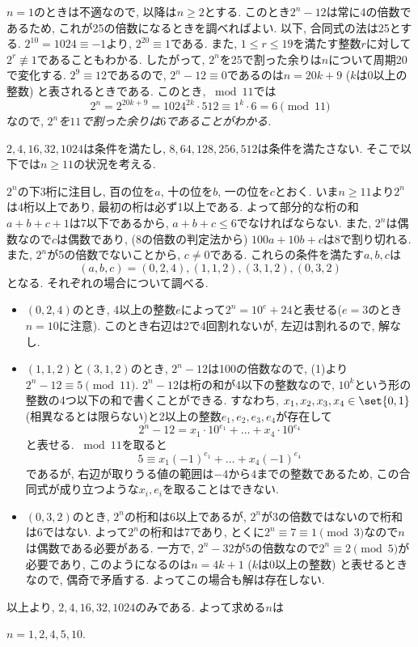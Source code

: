 $n=1$のときは不適なので, 以降は$n\geq 2$とする. このとき$2^n - 12$は常に4の倍数であるため, これが25の倍数になるときを調べればよい. 以下, 合同式の法は25とする. $2^{10} = 1024 \equiv -1$より, $2^{20}\equiv 1$である. また, $1\leq r\leq 19$を満たす整数$r$に対して$2^r\not\equiv 1$であることもわかる. したがって, $2^n$を25で割った余りは$n$について周期20で変化する. $2^9 \equiv 12$であるので, $2^n - 12\equiv 0$であるのは$n=20k + 9$ ($k$は0以上の整数) と表されるときである. このとき, $\bmod{11}$では
\[
2^n = 2^{20k + 9} = 1024^{2k} \cdot 512 \equiv 1^k \cdot 6 = 6 \pmod{11}
\]
なので, \emph{$2^n$を$11$で割った余りは$6$であることがわかる. }


$2,4,16,32,1024$は条件を満たし, $8,64,128,256,512$は条件を満たさない. そこで以下では$n\geq 11$の状況を考える.

$2^n$の下3桁に注目し, 百の位を$a$, 十の位を$b$, 一の位を$c$とおく. いま$n\geq 11$より$2^n$は4桁以上であり, 最初の桁は必ず1以上である. よって部分的な桁の和$a+b+c+1$は7以下であるから, $a+b+c\leq 6$でなければならない. また, $2^n$は偶数なので$c$は偶数であり, (8の倍数の判定法から) $100a+10b+c$は8で割り切れる. また, $2^n$が5の倍数でないことから, $c\neq 0$である. これらの条件を満たす$a,b,c$は
\[
(a,b,c) = (0,2,4), (1,1,2), (3,1,2) ,(0,3,2)
\]
となる. それぞれの場合について調べる.
\begin{itemize}
\item $(0,2,4)$のとき, 4以上の整数$e$によって$2^n = 10^{e} + 24$と表せる($e=3$のとき$n=10$に注意). このとき右辺は2で4回割れないが, 左辺は割れるので, 解なし.
\item $(1,1,2)$と$(3,1,2)$のとき, $2^n - 12$は100の倍数なので, (1)より$2^n -12 \equiv 5\pmod{11}$. $2^n - 12$は桁の和が4以下の整数なので, $10^k$という形の整数の4つ以下の和で書くことができる. すなわち, $x_1,x_2,x_3,x_4\in \set{0,1}$ (相異なるとは限らない)と2以上の整数$e_1,e_2,e_3,e_4$が存在して
\[
2^n - 12 = x_1\cdot 10^{e_1} + \dots + x_4\cdot 10^{e_4}
\]
と表せる. $\bmod{11}$を取ると
\[
5\equiv x_1(-1)^{e_1} + \dots + x_4(-1)^{e_4}
\]
であるが, 右辺が取りうる値の範囲は$-4$から$4$までの整数であるため, この合同式が成り立つような$x_i, e_i$を取ることはできない.
 \item $(0,3,2)$のとき, $2^n$の桁和は6以上であるが, $2^n$が3の倍数ではないので桁和は6ではない. よって$2^n$の桁和は7であり, とくに$2^n \equiv 7\equiv 1\pmod{3}$なので$n$は偶数である必要がある. 一方で, $2^n - 32$が$5$の倍数なので$2^n\equiv 2\pmod{5}$が必要であり, このようになるのは$n=4k+1$ ($k$は0以上の整数) と表せるときなので, 偶奇で矛盾する. よってこの場合も解は存在しない.
\end{itemize}
以上より, $2,4,16,32,1024$のみである. よって求める$n$は
\begin{center}
\emph{$n=1,2,4,5,10$}.
\end{center}
